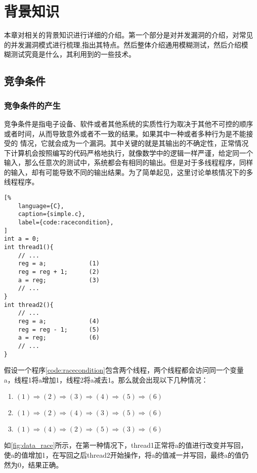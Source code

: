 \section{背景知识}



本章对相关的背景知识进行详细的介绍。第一个部分是对并发漏洞的介绍，对常见的并发漏洞模式进行梳理,指出其特点。然后整体介绍通用模糊测试，然后介绍模糊测试究竟是什么，其利用到的一些技术。

\subsection{竞争条件}

\subsubsection{竞争条件的产生}

竞争条件是指电子设备、软件或者其他系统的实质性行为取决于其他不可控的顺序或者时间，从而导致意外或者不一致的结果。如果其中一种或者多种行为是不能接受的 情况，它就会成为一个漏洞。其中关键的就是其输出的不确定性，正常情况下计算机会按照编写的代码严格地执行，就像数学中的逻辑一样严谨，给定同一个输入，那么任意次的测试中，系统都会有相同的输出。但是对于多线程程序，同样的输入，却有可能导致不同的输出结果。为了简单起见，这里讨论单核情况下的多线程程序。

\begin{lstlisting}[%
    language={C},
    caption={simple.c},
    label={code:racecondition},
]
int a = 0;
int thread1(){
    // ...
    reg = a; 			(1)
    reg = reg + 1;		(2)
    a = reg;			(3)
    // ...
}
int thread2(){
	// ...
	reg = a;			(4)
	reg = reg - 1;		(5)
	a = reg;			(6)
	// ...
}
\end{lstlisting}

假设一个程序\autoref{code:racecondition}包含两个线程，两个线程都会访问同一个变量a，线程1将a增加1，线程2将a减去1。那么就会出现以下几种情况：

\begin{enumerate}
\item $(1) \Rightarrow (2) \Rightarrow (3) \Rightarrow (4) \Rightarrow (5) \Rightarrow (6)$
\item $(1) \Rightarrow (2) \Rightarrow (4) \Rightarrow (3) \Rightarrow (5) \Rightarrow (6)$
\item $(1) \Rightarrow (4) \Rightarrow (2) \Rightarrow (5) \Rightarrow (3) \Rightarrow (6)$
\end{enumerate}

如\autoref{fig:data_race}所示，在第一种情况下，thread1正常将a的值进行改变并写回，使a的值增加1，在写回之后thread2开始操作，将a的值减一并写回，最终a的值仍然为0，结果正确。

